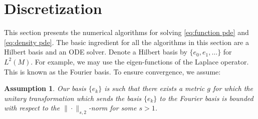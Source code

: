 \documentclass[final,leqno]{siamart}
\newtheorem{ass}[theorem]{Assumption}
\begin{document}
%
%

\section{Discretization} \label{sec:discretization}
This section presents the numerical algorithms for solving \eqref{eq:function pde} and \eqref{eq:density pde}.
The basic ingredient for all the algorithms in this section are a Hilbert basis and an ODE solver.
Denote a Hilbert basis by $\{ e_{0}, e_{1},\dots \}$ for $L^{2}(M)$.
For example, we may use the eigen-functions of the Laplace operator.
This is known as the Fourier basis.
To ensure convergence, we assume:
\begin{ass} \label{ass:basis}
	Our basis $\{ e_{k} \}$ is such that there exists a metric $g$ for which the unitary transformation which sends the basis $\{ e_{k} \}$ to the Fourier basis is bounded with respect to the $\| \cdot \|_{s,2}$-norm for some $s > 1$.
\end{ass}
\end{document}
